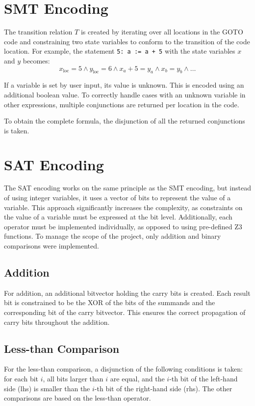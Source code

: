 \documentclass[sigconf,natbib=false]{acmart}
\begin{document}
\section{SMT Encoding}
The transition relation \( T \) is created by iterating over all locations in the GOTO code and constraining two state variables to conform to the transition of the code location. For example, the statement \texttt{5: a := a + 5} with the state variables \( x \) and \( y \) becomes:
\[
x_{\text{loc}} = 5 \wedge y_{\text{loc}} = 6 \wedge x_a + 5 = y_a \wedge x_b = y_b \wedge \ldots
\]

If a variable is set by user input, its value is unknown. This is encoded using an additional boolean value. To correctly handle cases with an unknown variable in other expressions, multiple conjunctions are returned per location in the code.

To obtain the complete formula, the disjunction of all the returned conjunctions is taken.

\section{SAT Encoding}
The SAT encoding works on the same principle as the SMT encoding, but instead of using integer variables, it uses a vector of bits to represent the value of a variable. This approach significantly increases the complexity, as constraints on the value of a variable must be expressed at the bit level. Additionally, each operator must be implemented individually, as opposed to using pre-defined Z3 functions. To manage the scope of the project, only addition and binary comparisons were implemented.

\subsection{Addition}
For addition, an additional bitvector holding the carry bits is created. Each result bit is constrained to be the XOR of the bits of the summands and the corresponding bit of the carry bitvector. This ensures the correct propagation of carry bits throughout the addition.

\subsection{Less-than Comparison}
For the less-than comparison, a disjunction of the following conditions is taken: for each bit \( i \), all bits larger than \( i \) are equal, and the \( i \)-th bit of the left-hand side (lhs) is smaller than the \( i \)-th bit of the right-hand side (rhs). The other comparisons are based on the less-than operator.
\end{document}
